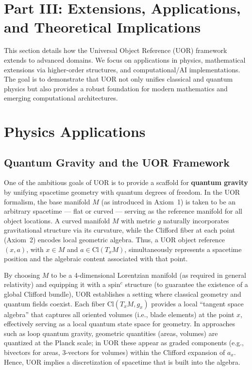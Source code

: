 \documentclass[12pt]{article}
\begin{document}
\section*{Part III: Extensions, Applications, and Theoretical Implications}

This section details how the Universal Object Reference (UOR) framework extends to advanced domains. We focus on applications in physics, mathematical extensions via higher-order structures, and computational/AI implementations. The goal is to demonstrate that UOR not only unifies classical and quantum physics but also provides a robust foundation for modern mathematics and emerging computational architectures.

\section{Physics Applications}

\subsection{Quantum Gravity and the UOR Framework}
One of the ambitious goals of UOR is to provide a scaffold for \textbf{quantum gravity} by unifying spacetime geometry with quantum degrees of freedom. In the UOR formalism, the base manifold $M$ (as introduced in Axiom~1) is taken to be an arbitrary spacetime --- flat or curved --- serving as the reference manifold for all object locations. A curved manifold $M$ with metric $g$ naturally incorporates gravitational structure via its curvature, while the Clifford fiber at each point (Axiom~2) encodes local geometric algebra. Thus, a UOR object reference $(x,a)$, with $x \in M$ and $a \in \mathrm{Cl}(T_x M)$, simultaneously represents a spacetime position and the algebraic content associated with that point.

By choosing $M$ to be a 4-dimensional Lorentzian manifold (as required in general relativity) and equipping it with a $\text{spin}^c$ structure (to guarantee the existence of a global Clifford bundle), UOR establishes a setting where classical geometry and quantum fields coexist. Each fiber $\mathrm{Cl}(T_x M, g_x)$ provides a local ``tangent space algebra'' that captures all oriented volumes (i.e., blade elements) at the point $x$, effectively serving as a local quantum state space for geometry. In approaches such as loop quantum gravity, geometric quantities (areas, volumes) are quantized at the Planck scale; in UOR these appear as graded components (e.g., bivectors for areas, 3-vectors for volumes) within the Clifford expansion of $a_x$. Hence, UOR implies a discretization of spacetime that is built into the algebra.
\end{document}
